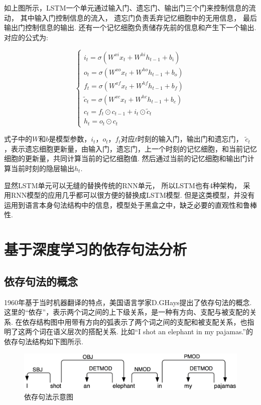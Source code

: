 \documentclass[bachelor,adobefonts]{jnuthesis}
\begin{document}
如上图所示，LSTM一个单元通过输入门、遗忘门、输出门三个门来控制信息的流动，
其中输入门控制信息的流入，
遗忘门负责丢弃记忆细胞中的无用信息，
最后输出门控制信息的输出.
还有一个记忆细胞负责储存先前的信息和产生下一个输出.
对应的公式为:

\begin{equation}
  \left\{
  \begin{array}{l}
   i_{t} = \sigma(W^{xi}x_{t}+W^{hi}h_{t-1}+b_{i}) \\ 
   o_{t} = \sigma(W^{xo}x_{t}+W^{ho}h_{t-1}+b_{o}) \\ 
   f_{t} = \sigma(W^{xf}x_{t}+W^{hf}h_{t-1}+b_{f}) \\ 
   \widetilde{c}_{t} = \sigma(W^{xc}x_{t}+W^{hc}h_{t-1}+b_{c}) \\
   c_{t} = f_{t} \odot c_{t-1} + i_{t} \odot \widetilde{c}_{t} \\
   h_{t} = o_{t} \odot c_{t}
  \end{array}
  \right.
\end{equation}

式子中的$W$和$b$是模型参数，$i_{t}$，$o_{t}$，$f_{t}$对应$t$时刻的输入门，输出门和遗忘门，
$\widetilde{c}_{t}$，表示遗忘细胞更新量，由输入门，遗忘门，上一个时刻的记忆细胞，和当前记忆细胞的更新量，共同计算当前的记忆细胞值.
然后通过当前的记忆细胞和输出门计算当前时刻的隐层输出$h_{t}$.

显然LSTM单元可以无缝的替换传统的RNN单元，
所以LSTM也有4种架构，
采用RNN模型的应用几乎都可以很方便的替换成LSTM模型.
但是这类模型，并没有运用到语言本身句法结构中的信息，模型处于黑盒之中，缺乏必要的直观性和鲁棒性.

\section{基于深度学习的依存句法分析}
\subsection{依存句法的概念}
1960年基于当时机器翻译的特点，美国语言学家D.GHays提出了依存句法的概念\cite{Hays1960Grouping}.
这里的“依存”，表示两个词之间的上下级关系，是一种有方向、支配与被支配的关系.
在依存结构图中用带有方向的弧表示了两个词之间的支配和被支配关系，也指明了这两个词在语义层次的搭配关系.
比如“I shot an elephant in my pajamas.”的依存句法结构如下图所示.

\begin{figure}[h!]
  \centering
  \includegraphics[width=0.7\linewidth]{yicunjufa.png}
  \caption{依存句法示意图}
\end{figure}
\end{document}
